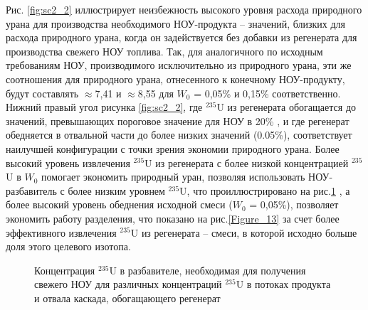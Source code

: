Рис. \ref{fig:sc2_2} иллюстрирует неизбежность высокого уровня расхода природного урана для производства необходимого НОУ-продукта  -- значений, близких для расхода природного урана, когда он задействуется без добавки из регенерата для производства свежего НОУ топлива. Так, для аналогичного по исходным требованиям НОУ, производимого исключительно из природного урана, эти же соотношения для природного урана, отнесенного к конечному НОУ-продукту, будут составлять $\approx$7,41 и $\approx$8,55 для $W_0$ = 0,05\% и 0,15\% соответственно. Нижний правый угол рисунка \ref{fig:sc2_2}, где $^{235}$U из регенерата обогащается до значений, превышающих пороговое значение для НОУ в 20\% \cite{brownOriginsSignificanceLimit2016}, и где регенерат обедняется в отвальной части до более низких значений (0.05\%), соответствует наилучшей конфигурации с точки зрения экономии природного урана. Более высокий уровень извлечения $^{235}$U из регенерата с более низкой концентрацией $^{235}$U в $W_0$ помогает экономить природный уран, позволяя использовать НОУ-разбавитель с более низким уровнем $^{235}$U, что проиллюстрировано на рис.\ref{fig:sc2_LEU_D} , а более высокий уровень обеднения исходной смеси ($W_0$ = 0,05\%), позволяет экономить работу разделения, что показано на рис.\ref{Figure_13} за счет более эффективного извлечения $^{235}$U из регенерата -- смеси, в которой исходно больше доля этого целевого изотопа.

\begin{figure}[ht]
  \caption{Концентрация $^{235}$U в разбавителе, необходимая для получения свежего НОУ для различных концентраций $^{235}$U в потоках продукта и отвала каскада, обогащающего регенерат}\label{fig:sc2_LEU_D}
\end{figure}

